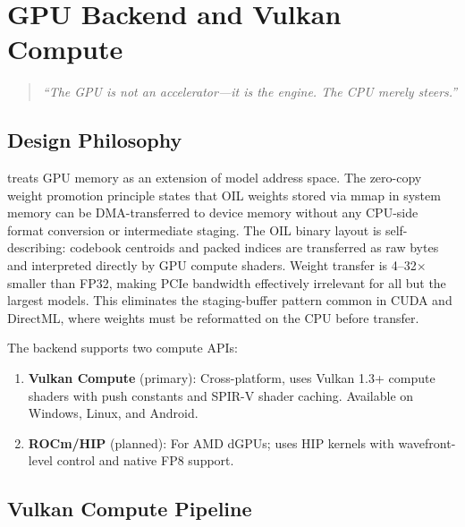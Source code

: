 
\chapter{GPU Backend and Vulkan Compute}
\label{ch:gpu_backend}

\begin{quote}
\textit{``The GPU is not an accelerator---it is the engine. The CPU merely steers.''}
\end{quote}

\section{Design Philosophy}
\label{sec:gpu_design}

\MYTHOS{} treats GPU memory as an extension of model address space. The
zero-copy weight promotion principle states that OIL weights stored via mmap
in system memory can be DMA-transferred to device memory without any CPU-side
format conversion or intermediate staging. The OIL binary layout is
self-describing: codebook centroids and packed indices are transferred as raw
bytes and interpreted directly by GPU compute shaders. Weight transfer is
4--32$\times$ smaller than FP32, making PCIe bandwidth effectively irrelevant
for all but the largest models. This eliminates the staging-buffer pattern
common in CUDA and DirectML, where weights must be reformatted on the CPU
before transfer.

The backend supports two compute APIs:
\begin{enumerate}
    \item \textbf{Vulkan Compute} (primary): Cross-platform, uses Vulkan 1.3+
          compute shaders with push constants and SPIR-V shader caching.
          Available on Windows, Linux, and Android.
    \item \textbf{ROCm/HIP} (planned): For AMD dGPUs; uses HIP kernels with
          wavefront-level control and native FP8 support.
\end{enumerate}

\section{Vulkan Compute Pipeline}
\label{sec:vulkan_pipeline}

